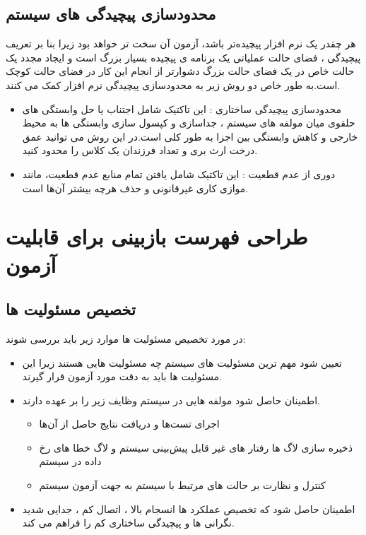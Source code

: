 \subsection{محدودسازی پیچیدگی های سیستم}
هر چقدر یک نرم افزار پیچیده‌تر باشد، آزمون آن سخت تر خواهد بود زیرا بنا بر تعریف پیچیدگی ، فضای حالت عملیاتی یک برنامه ی پیچیده بسیار بزرگ است و ایجاد مجدد یک حالت خاص در یک فضای حالت بزرگ دشوارتر از انجام این کار در فضای حالت کوچک است.به طور خاص دو روش زیر به محدودسازی پیچیدگی نرم افزار کمک می کنند.
\begin{itemize}
\item
محدود‌سازی پیچیدگی ساختاری :
این تاکتیک شامل اجتناب یا حل وابستگی های حلقوی میان مولفه های سیستم ، جداسازی و کپسول سازی وابستگی ها به محیط خارجی و کاهش وابستگی بین اجزا به طور کلی است.در این روش می توانید عمق درخت ارث بری  و تعداد فرزندان یک کلاس را محدود کنید.
\item
دوری از عدم قطعیت  :
این تاکتیک شامل یافتن تمام منابع عدم قطعیت، مانند موازی کاری غیرقانونی و حذف هرچه بیشتر آن‌ها است.
\end{itemize}
\section{طراحی فهرست بازبینی برای قابلیت آزمون}
\subsection{تخصیص مسئولیت ها} 
در مورد تخصیص مسئولیت ها موارد زیر باید بررسی شوند:
\begin{itemize}
\item
تعیین شود مهم ترین مسئولیت های سیستم چه مسئولیت هایی هستند زیرا این مسئولیت ها باید به دقت مورد آزمون قرار گیرند.
\item
اطمینان حاصل شود مولفه هایی در سیستم وظایف زیر را بر عهده دارند.
\begin{itemize}
\item
اجرای تست‌ها و دریافت نتایج حاصل از آن‌ها
\item
ذخیره سازی لاگ ها رفتار های غیر قابل پیش‌بینی سیستم و لاگ خطا های رخ داده در سیستم
\item
کنترل و نظارت بر حالت های مرتبط با سیستم به جهت آزمون سیستم
\end{itemize}
\item
اطمینان حاصل شود که تخصیص عملکرد ها انسجام بالا ، اتصال کم ، جدایی شدید نگرانی ها و پیچیدگی ساختاری کم را فراهم می کند.
\end{itemize}

